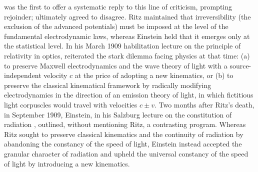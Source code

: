 \documentclass[submitted,12pt]{article} %
\begin{document}
\citet{Einstein1909} was the first to offer a systematic reply to this line of criticism, prompting  rejoinder; \citet{RitzEinstein1909b} ultimately agreed to disagree. Ritz maintained that irreversibility (the exclusion of the advanced potentials) must be imposed at the level of the fundamental electrodynamic laws, whereas Einstein held that it emerges only at the statistical level. In his March 1909 habilitation lecture on the principle of relativity in optics, \citet{Ritz1909} reiterated the stark dilemma facing physics at that time: (a) to preserve Maxwell electrodynamics and the wave theory of light with a source-independent velocity $c$ at the price of adopting a new kinematics, or (b) to preserve the classical kinematical framework by radically modifying electrodynamics in the direction of an emission theory of light, in which fictitious light corpuscles would travel with velocities $c \pm v$. Two months after Ritz’s death, in September 1909, Einstein, in his Salzburg lecture on the constitution of radiation \citep{Einstein1909a}, outlined, without mentioning Ritz, a contrasting program. Whereas Ritz sought to preserve classical kinematics and the continuity of radiation by abandoning the constancy of the speed of light, Einstein instead accepted the granular character of radiation and upheld the universal constancy of the speed of light by introducing a new kinematics.





\end{document}
